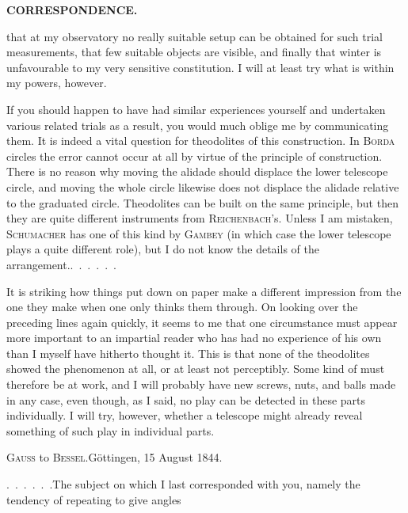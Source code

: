 \par\clearpage
\noindent{}\hfill{\small\textbf{CORRESPONDENCE.}}\hfill\null\par\medskip
\noindent that at my observatory no really suitable setup can be obtained for such trial measurements, that few suitable objects are visible, and finally that winter is unfavourable to my very sensitive constitution. I will at least try what is within my powers, however.

\par\noindent\hspace*{\parindent}If you should happen to have had similar experiences yourself and undertaken various related trials as a result, you would much oblige me by communicating them. It is indeed a vital question for theodolites of this construction. In \textsc{Borda} circles the error cannot occur at all by virtue of the principle of construction. There is no reason why moving the alidade should displace the lower telescope  circle, and moving the whole circle likewise does not displace the alidade relative to the graduated circle. Theodolites can be built on the same principle, but then they are quite different instruments from \textsc{Reichenbach}'s. Unless I am mistaken, \textsc{Schumacher} has one of this kind by \textsc{Gambey} (in which case the lower telescope plays a quite different role), but I do not know the details of the arrangement.\enspace .\ .\ .\ .\ .\ .

\par\noindent\hspace*{\parindent}It is striking how things put down on paper make a different impression from the one they make when one only thinks them through. On looking over the preceding lines again quickly, it seems to me that one circumstance must appear more important to an impartial reader who has had no experience of his own than I myself have hitherto thought it. This is that  none of the theodolites showed the phenomenon at all, or at least not perceptibly. Some kind of  must therefore be at work, and I will probably have new screws, nuts, and balls made in any case, even though, as I said, no play can be detected in these parts individually. I will try, however, whether a  telescope might already reveal something of such play in individual parts.

\par\bigskip
\begin{center}{\large\textsc{Gauss} to \textsc{Bessel}.\quad Göttingen, 15 August 1844.}\end{center}
\par\noindent\hspace*{\parindent}.\ .\ .\ .\ .\ .\enspace The subject on which I last corresponded with you, namely the tendency of repeating  to give angles

